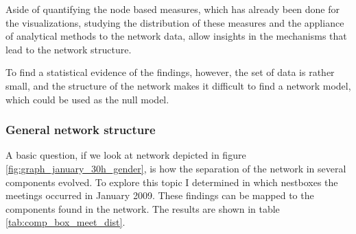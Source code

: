 Aside of quantifying the node based measures, which has already been done for the visualizations, studying the distribution of these measures and the appliance of analytical methods to the network data, allow insights in the mechanisms that lead to the network structure.  

To find a statistical evidence of the findings, however, the set of data is rather small, and the structure of the network makes it difficult to find a network model, which could be used as the null model. 

\subsubsection{General network structure}
\label{subsubsec:general_structure}

A basic question, if we look at network depicted in figure \ref{fig:graph_january_30h_gender}, is how the separation of the network in several components evolved. To explore this topic I determined in which nestboxes the meetings occurred in January 2009. These findings can be mapped to the components found in the network. The results are shown in table \ref{tab:comp_box_meet_dist}.

